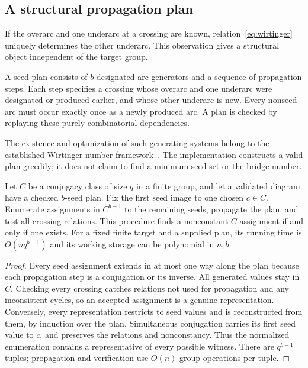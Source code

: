 \subsection{A structural propagation plan}

If the overarc and one underarc at a crossing are known,
relation~\eqref{eq:wirtinger} uniquely determines the other underarc.
This observation gives a structural object independent of the target
group.

\begin{definition}
A seed plan consists of $b$ designated arc generators and a sequence of
propagation steps. Each step specifies a crossing whose overarc and one
underarc were designated or produced earlier, and whose other underarc
is new. Every nonseed arc must occur exactly once as a newly produced
arc. A plan is checked by replaying these purely combinatorial
dependencies.
\end{definition}

The existence and optimization of such generating systems belong to the
established Wirtinger-number framework~\cite{blair}. The implementation
constructs a valid plan greedily; it does not claim to find a minimum
seed set or the bridge number.

\begin{theorem}
\label{thm:seedsearch}
Let $C$ be a conjugacy class of size $q$ in a finite group, and let a
validated diagram have a checked $b$-seed plan. Fix the first seed image
to one chosen $c\in C$. Enumerate assignments in $C^{b-1}$ to the
remaining seeds, propagate the plan, and test all crossing relations.
This procedure finds a nonconstant $C$-assignment if and only if one
exists. For a fixed finite target and a supplied plan, its running time
is $O(nq^{b-1})$ and its working storage can be polynomial in $n,b$.
\end{theorem}
\begin{proof}
Every seed assignment extends in at most one way along the plan because
each propagation step is a conjugation or its inverse. All generated
values stay in $C$. Checking every crossing catches relations not used
for propagation and any inconsistent cycles, so an accepted assignment
is a genuine representation. Conversely, every representation restricts
to seed values and is reconstructed from them, by induction over the
plan. Simultaneous conjugation carries its first seed value to $c$, and
preserves the relations and nonconstancy. Thus the normalized enumeration
contains a representative of every possible witness. There are
$q^{b-1}$ tuples; propagation and verification use $O(n)$ group
operations per tuple.
\end{proof}

